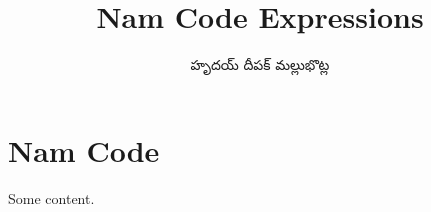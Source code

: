 \documentclass[../main.tex]{subfiles}
\title{Nam Code Expressions}
\author{\begin{telugu}హృదయ్ దీపక్ మల్లుభొట్ల\end{telugu}}
\date{}
\begin{document}
	\onlyinsubfile{\maketitle}

	\section{Nam Code} \label{sec:nce}

	Some content.
\end{document}
